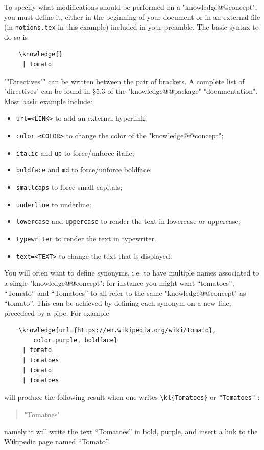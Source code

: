 \documentclass{article}
\begin{document}
To specify what modifications should be performed on a "knowledge@@concept", 
you must define it, either in the beginning of your document or in an external file (in \texttt{notions.tex} in this example) included in your preamble.
The basic syntax to do so is
\begin{verbatim}
    \knowledge{}
     | tomato
\end{verbatim}
\AP""Directives"" can be written between the pair of brackets. A complete list of "directives" can be found in §5.3 of the "knowledge@@package" "documentation". Most basic example include:
\begin{itemize}
    \item \verb|url=<LINK>| to add an external hyperlink;
    \item \verb|color=<COLOR>| to change the color of the "knowledge@@concept";
    \item \verb|italic| and \verb|up| to force/unforce italic;
    \item \verb|boldface| and \verb|md| to force/unforce boldface;
    \item \verb|smallcaps| to force small capitals;
    \item \verb|underline| to underline;
    \item \verb|lowercase| and \verb|uppercase| to render the text in lowercase or uppercase;
    \item \verb|typewriter| to render the text in typewriter.
    \item \verb|text=<TEXT>| to change the text that is displayed.
\end{itemize}

You will often want to define synonyms, i.e. to have multiple names associated to a single "knowledge@@concept": for instance you might want ``tomatoes'', ``Tomato'' and  ``Tomatoes'' to all refer to the same "knowledge@@concept" as ``tomato''. This can be achieved by defining each synonym on a new line, precedeed by a pipe. For example
\begin{verbatim}
    \knowledge{url={https://en.wikipedia.org/wiki/Tomato},
        color=purple, boldface}
     | tomato
     | tomatoes
     | Tomato
     | Tomatoes
\end{verbatim}
will produce the following result when one writes \verb|\kl{Tomatoes}| or
%
\verb|"Tomatoes"|%
:%
\begin{quote}
    "Tomatoes"
\end{quote}
namely it will write the text ``Tomatoes'' in bold, purple, and insert a link to the Wikipedia page named ``Tomato''.
\end{document}
